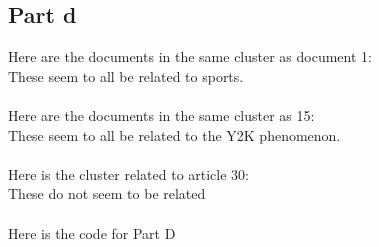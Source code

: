 \documentclass[twoside,11pt]{article}
\theoremstyle{definition}
\begin{document}
\newpage

\subsection*{Part d}

Here are the documents in the same cluster as document 1:\\

These seem to all be related to sports. \\
\\
Here are the documents in the same cluster as 15:\\

These seem to all be related to the Y2K phenomenon. \\
\\
Here is the cluster related to article 30:
\\

These do not seem to be related\\
\\
Here is the code for Part D\\

\end{document}
